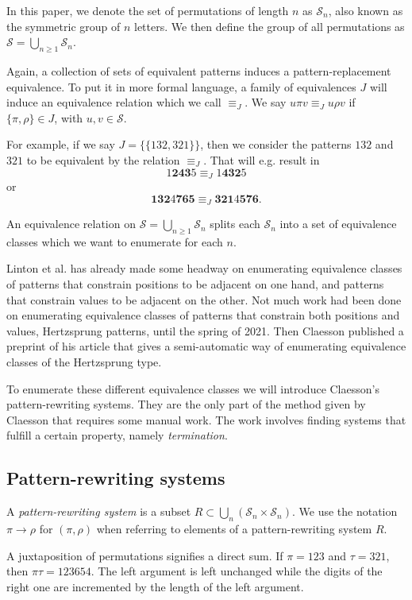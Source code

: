 \documentclass[a4paper, 11pt, english]{article}
\newcommand{\patternrule}{ \to \!}
\theoremstyle{definition}
\newcommand{\Sym}{\mathcal{S}}
\begin{document}
In this paper, we denote the set of permutations of length $n$ as $\Sym_n$, also known as the
symmetric group of $n$ letters. We then define the group of all permutations as $\Sym =
\bigcup_{n \geq 1} \Sym_n$.

Again, a collection of sets of equivalent patterns induces a pattern-replacement equivalence.
To put it in more formal language, a family of equivalences $J$ will induce an equivalence relation
which we call $\equiv_J$. We say $u \pi v \equiv_J u \rho v$ if $\{ \pi, \rho \} \in J$, with $u,v
\in \Sym$.

For example, if we say $J = \{ \{ 132, 321 \} \}$, then we consider the patterns $132$ and $321$ to
be equivalent by the relation $\equiv_J$. That will e.g. result in
\[
    1\bm{243}5 \equiv_J 1\bm{432}5
\]
or
\[
  \bm{132}4\bm{765} \equiv_J \bm{321}4\bm{576}.
\]

An equivalence relation on $\Sym = \bigcup_{n \geq 1} \Sym_n$ splits each $\Sym_n$
into a set of equivalence classes which we want to enumerate for each $n$. 

Linton et al. has already made some headway on enumerating equivalence classes of patterns that constrain
positions to be adjacent on one hand, and patterns that constrain values to be adjacent on the other.
Not much work had been done on enumerating equivalence classes of patterns that constrain both
positions and values, Hertzsprung patterns, until the spring of 2021. Then Claesson published a
preprint of his article \cite{claesson:2021} that gives a semi-automatic way of enumerating
equivalence classes of the Hertzsprung type.

To enumerate these different equivalence classes we will introduce Claesson's 
pattern-rewriting systems. They are the only part of the method given by Claesson that requires
some manual work. The work involves finding systems that fulfill a certain property, namely
\emph{termination}.

\subsection{Pattern-rewriting systems}
A \emph{pattern-rewriting system} is a subset $R \subset \bigcup_{n} (\Sym_n \times \Sym_n)$.
We use the notation $\pi \patternrule \rho$ for $(\pi, \rho)$ when referring
to elements of a pattern-rewriting system $R$.

A juxtaposition of permutations signifies a direct sum. If $\pi=123$ and
$\tau=321$, then $\pi\tau=123654$. The left argument is left unchanged while the
digits of the right one are incremented by the length of the left argument.
\end{document}
